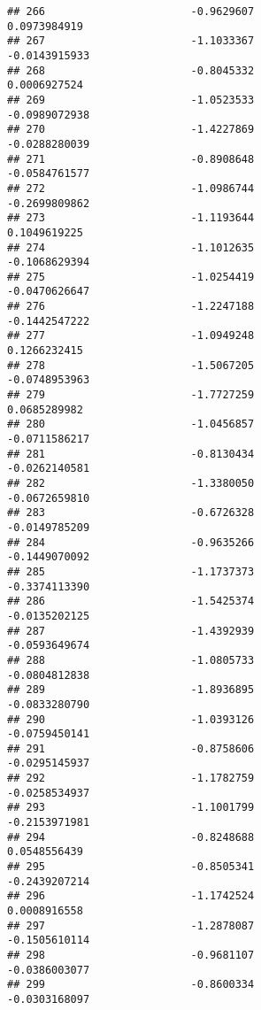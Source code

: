 \documentclass[
]{article}
\begin{document}
\begin{verbatim}
## 266                       -0.9629607                          0.0973984919
## 267                       -1.1033367                         -0.0143915933
## 268                       -0.8045332                          0.0006927524
## 269                       -1.0523533                         -0.0989072938
## 270                       -1.4227869                         -0.0288280039
## 271                       -0.8908648                         -0.0584761577
## 272                       -1.0986744                         -0.2699809862
## 273                       -1.1193644                          0.1049619225
## 274                       -1.1012635                         -0.1068629394
## 275                       -1.0254419                         -0.0470626647
## 276                       -1.2247188                         -0.1442547222
## 277                       -1.0949248                          0.1266232415
## 278                       -1.5067205                         -0.0748953963
## 279                       -1.7727259                          0.0685289982
## 280                       -1.0456857                         -0.0711586217
## 281                       -0.8130434                         -0.0262140581
## 282                       -1.3380050                         -0.0672659810
## 283                       -0.6726328                         -0.0149785209
## 284                       -0.9635266                         -0.1449070092
## 285                       -1.1737373                         -0.3374113390
## 286                       -1.5425374                         -0.0135202125
## 287                       -1.4392939                         -0.0593649674
## 288                       -1.0805733                         -0.0804812838
## 289                       -1.8936895                         -0.0833280790
## 290                       -1.0393126                         -0.0759450141
## 291                       -0.8758606                         -0.0295145937
## 292                       -1.1782759                         -0.0258534937
## 293                       -1.1001799                         -0.2153971981
## 294                       -0.8248688                          0.0548556439
## 295                       -0.8505341                         -0.2439207214
## 296                       -1.1742524                          0.0008916558
## 297                       -1.2878087                         -0.1505610114
## 298                       -0.9681107                         -0.0386003077
## 299                       -0.8600334                         -0.0303168097

\end{verbatim}
\end{document}
